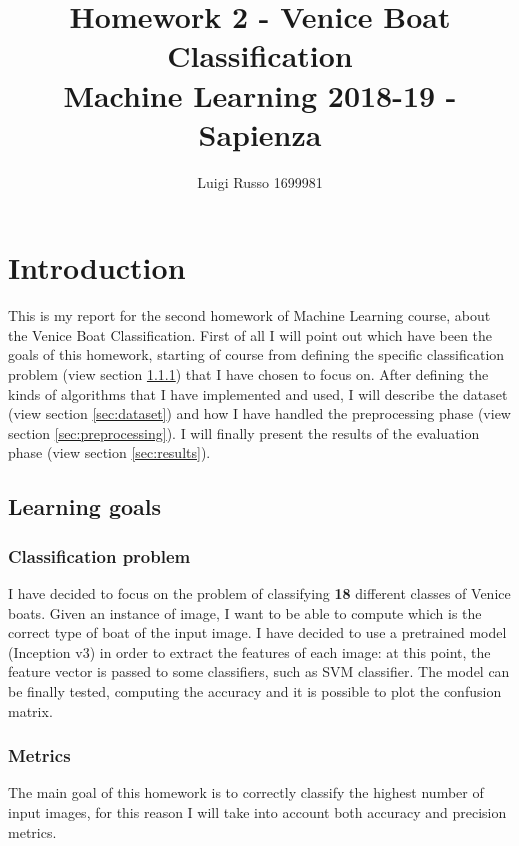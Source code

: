 \documentclass[12pt]{article}
\title{Homework 2 - Venice Boat Classification\\
	\large Machine Learning 2018-19 - Sapienza}
\author{Luigi Russo 1699981}
\begin{document}
	
\maketitle
\newpage
\tableofcontents
\newpage
\section{Introduction}
This is my report for the second homework of Machine Learning course, about the Venice Boat Classification. First of all I will point out which have been the goals of this homework, starting of course from defining the specific classification problem (view section \ref{sec:image_classification_problem}) that I have chosen to focus on. After defining the kinds of algorithms that I have implemented and used, I will describe the dataset (view section \ref{sec:dataset}) and how I have handled the preprocessing phase (view section \ref{sec:preprocessing}). I will finally present the results of the evaluation phase (view section \ref{sec:results}).

\subsection{Learning goals}
\subsubsection{Classification problem}
\label{sec:image_classification_problem}
I have decided to focus on the problem of classifying \textbf{18} different classes of Venice boats. Given an instance of image, I want to be able to compute which is the correct type of boat of the input image. I have decided to use a pretrained model (Inception v3) in order to extract the features of each image: at this point, the feature vector is passed to some classifiers, such as SVM classifier. The model can be finally tested, computing the accuracy and it is possible to plot the confusion matrix.
\subsubsection{Metrics}
The main goal of this homework is to correctly classify the highest number of input images, for this reason I will take into account both accuracy and precision metrics.
\end{document}
